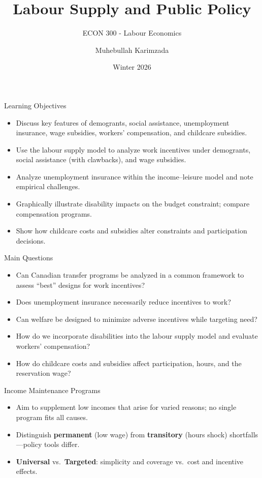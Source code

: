 \documentclass[aspectratio=169]{beamer}
\title{\textbf{Labour Supply and Public Policy
 \vspace{.5cm}\\  }}
\subtitle{ {\large ECON 300 - Labour Economics}}
\author{Muhebullah Karimzada}
\date{Winter 2026}
\begin{document}
\begin{frame}[plain]
  \titlepage
\end{frame}


\begin{frame}{Learning Objectives}
\transfade
\begin{itemize}[<+->]
  \item Discuss key features of demogrants, social assistance, unemployment insurance, wage subsidies, workers’ compensation, and childcare subsidies.
  \item Use the labour supply model to analyze work incentives under demogrants, social assistance (with clawbacks), and wage subsidies.
  \item Analyze unemployment insurance within the income–leisure model and note empirical challenges.
  \item Graphically illustrate disability impacts on the budget constraint; compare compensation programs.
  \item Show how childcare costs and subsidies alter constraints and participation decisions.
\end{itemize}
\end{frame}

\begin{frame}{Main Questions}
\transfade
\begin{itemize}[<+->]
  \item Can Canadian transfer programs be analyzed in a common framework to assess “best” designs for work incentives?
  \item Does unemployment insurance necessarily reduce incentives to work?
  \item Can welfare be designed to minimize adverse incentives while targeting need?
  \item How do we incorporate disabilities into the labour supply model and evaluate workers’ compensation?
  \item How do childcare costs and subsidies affect participation, hours, and the reservation wage?
\end{itemize}
\end{frame}


\begin{frame}{Income Maintenance Programs}
\transfade
\begin{itemize}[<+->]
  \item Aim to supplement low incomes that arise for varied reasons; no single program fits all causes.
  \item Distinguish \textbf{permanent} (low wage) from \textbf{transitory} (hours shock) shortfalls—policy tools differ.
  \item \textbf{Universal} vs.\ \textbf{Targeted}: simplicity and coverage vs.\ cost and incentive effects.
\end{itemize}
\end{frame}
\end{document}
